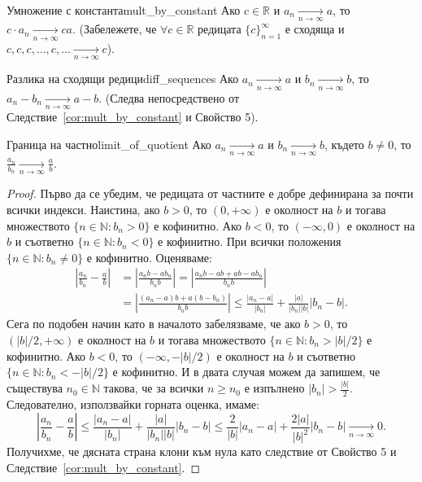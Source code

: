 \begin{corollary}{Умножение с константа}{mult_by_constant}
Ако $c \in \mathbb{R}$ и $a_n \xrightarrow[n\to\infty]{} a$, то $c \cdot a_n \xrightarrow[n\to\infty]{} ca$. (Забележете, че $\forall c \in \mathbb{R}$ редицата $\{c\}_{n=1}^{\infty}$ е сходяща и $c, c, c, \dots, c, \dots \xrightarrow[n\to\infty]{} c$).
\end{corollary}

\begin{corollary}{Разлика на сходящи редици}{diff_sequences}
Ако $a_n \xrightarrow[n\to\infty]{} a$ и $b_n \xrightarrow[n\to\infty]{} b$, то $a_n - b_n \xrightarrow[n\to\infty]{} a - b$. (Следва непосредствено от Следствие~\ref{cor:mult_by_constant} и Свойство 5).
\end{corollary}

\begin{theorem}{Граница на частно}{limit_of_quotient}
Ако $a_n \xrightarrow[n\to\infty]{} a$ и $b_n \xrightarrow[n\to\infty]{} b$, където $b \ne 0$, то $\frac{a_n}{b_n} \xrightarrow[n\to\infty]{} \frac{a}{b}$.
\end{theorem}

\begin{proof}
Първо да се убедим, че редицата от частните е добре дефинирана за почти всички индекси. Наистина, ако $b > 0$, то $(0, +\infty)$ е околност на $b$ и тогава множеството $\{n \in \mathbb{N} : b_n > 0\}$ е кофинитно. Ако $b < 0$, то $(-\infty, 0)$ е околност на $b$ и съответно $\{n \in \mathbb{N} : b_n < 0\}$ е кофинитно. При всички положения $\{n \in \mathbb{N} : b_n \ne 0\}$ е кофинитно. Оценяваме:
\begin{align*}
\left|\frac{a_n}{b_n} - \frac{a}{b}\right| &= \left|\frac{a_n b - a b_n}{b_n b}\right| = \left|\frac{a_n b - ab + ab - a b_n}{b_n b}\right| \\
&= \left|\frac{(a_n - a)b + a(b - b_n)}{b_n b}\right| \le \frac{|a_n - a|}{|b_n|} + \frac{|a|}{|b_n||b|}|b_n - b|.
\end{align*}
Сега по подобен начин като в началото забелязваме, че ако $b > 0$, то $(|b|/2, +\infty)$ е околност на $b$ и тогава множеството $\{n \in \mathbb{N} : b_n > |b|/2\}$ е кофинитно. Ако $b < 0$, то $(-\infty, -|b|/2)$ е околност на $b$ и съответно $\{n \in \mathbb{N} : b_n < -|b|/2\}$ е кофинитно. И в двата случая можем да запишем, че съществува $n_0 \in \mathbb{N}$ такова, че за всички $n \ge n_0$ е изпълнено $|b_n| > \frac{|b|}{2}$. Следователно, използвайки горната оценка, имаме:
\[
\left|\frac{a_n}{b_n} - \frac{a}{b}\right| \le \frac{|a_n - a|}{|b_n|} + \frac{|a|}{|b_n||b|}|b_n - b| \le \frac{2}{|b|}|a_n - a| + \frac{2|a|}{|b|^2}|b_n - b| \xrightarrow[n\to\infty]{} 0.
\]
Получихме, че дясната страна клони към нула като следствие от Свойство 5 и Следствие~\ref{cor:mult_by_constant}.
\end{proof}

